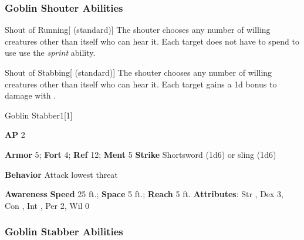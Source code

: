 \subsubsection{Goblin Shouter Abilities}

\begin{freeability}{Shout of Running}[ (standard)]
The shouter chooses any number of willing creatures other than itself who can hear it.
Each target does not have to spend  to use use the \textit{sprint} ability.
\end{freeability}

\vspace{0.5em}
\begin{freeability}{Shout of Stabbing}[ (standard)]
The shouter chooses any number of willing creatures other than itself who can hear it.
Each target gains a \plus1d bonus to damage with .
\end{freeability}

\begin{monsection}{Goblin Stabber}{1}[1]
\vspace{-1em}\vspace{-1em}
\begin{spellcontent}
\begin{spelltargetinginfo}
{\textbf{AP} 2}

\pari \textbf{Armor} 5;
\textbf{Fort} 4;
\textbf{Ref} 12;
\textbf{Ment} 5
\pari \textbf{Strike} Shortsword  (1d6) or sling  (1d6)



\pari \textbf{Behavior} Attack lowest threat
\end{spelltargetinginfo}
\end{spellcontent}

\begin{monsterfooter}
\pari \textbf{Awareness} 
\pari \textbf{Speed} 25 ft.;
\textbf{Space} 5 ft.;
\textbf{Reach} 5 ft.
\pari \textbf{Attributes}:
Str ,
Dex 3,
Con ,
Int ,
Per 2,
Wil 0
\end{monsterfooter}
\end{monsection}


\subsubsection{Goblin Stabber Abilities}

